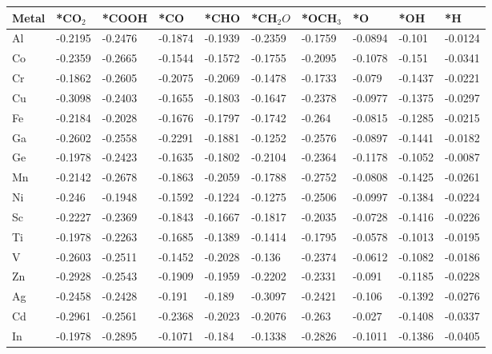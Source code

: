 \begin{table}[h]
  \centering
  {\fontsize{6}{12}\selectfont
  \begin{tabular}{*{10}{l}}
      \hline
      Metal & *CO$_2$ & *COOH& *CO     & *CHO    & *CH$_2O$& *OCH$_3$& *O      & *OH     & *H      \\
      \hline
      Al & -0.2195 & -0.2476 & -0.1874 & -0.1939 & -0.2359 & -0.1759 & -0.0894 & -0.101  & -0.0124 \\
      Co & -0.2359 & -0.2665 & -0.1544 & -0.1572 & -0.1755 & -0.2095 & -0.1078 & -0.151  & -0.0341 \\
      Cr & -0.1862 & -0.2605 & -0.2075 & -0.2069 & -0.1478 & -0.1733 & -0.079  & -0.1437 & -0.0221 \\
      Cu & -0.3098 & -0.2403 & -0.1655 & -0.1803 & -0.1647 & -0.2378 & -0.0977 & -0.1375 & -0.0297 \\
      Fe & -0.2184 & -0.2028 & -0.1676 & -0.1797 & -0.1742 & -0.264  & -0.0815 & -0.1285 & -0.0215 \\
      Ga & -0.2602 & -0.2558 & -0.2291 & -0.1881 & -0.1252 & -0.2576 & -0.0897 & -0.1441 & -0.0182 \\
      Ge & -0.1978 & -0.2423 & -0.1635 & -0.1802 & -0.2104 & -0.2364 & -0.1178 & -0.1052 & -0.0087 \\
      Mn & -0.2142 & -0.2678 & -0.1863 & -0.2059 & -0.1788 & -0.2752 & -0.0808 & -0.1425 & -0.0261 \\
      Ni & -0.246  & -0.1948 & -0.1592 & -0.1224 & -0.1275 & -0.2506 & -0.0997 & -0.1384 & -0.0224 \\
      Sc & -0.2227 & -0.2369 & -0.1843 & -0.1667 & -0.1817 & -0.2035 & -0.0728 & -0.1416 & -0.0226 \\
      Ti & -0.1978 & -0.2263 & -0.1685 & -0.1389 & -0.1414 & -0.1795 & -0.0578 & -0.1013 & -0.0195 \\
      V  & -0.2603 & -0.2511 & -0.1452 & -0.2028 & -0.136  & -0.2374 & -0.0612 & -0.1082 & -0.0186 \\
      Zn & -0.2928 & -0.2543 & -0.1909 & -0.1959 & -0.2202 & -0.2331 & -0.091  & -0.1185 & -0.0228 \\
      Ag & -0.2458 & -0.2428 & -0.191  & -0.189  & -0.3097 & -0.2421 & -0.106  & -0.1392 & -0.0276 \\
      Cd & -0.2961 & -0.2561 & -0.2368 & -0.2023 & -0.2076 & -0.263  & -0.027  & -0.1408 & -0.0337 \\
      In & -0.1978 & -0.2895 & -0.1071 & -0.184  & -0.1338 & -0.2826 & -0.1011 & -0.1386 & -0.0405 \\

\end{tabular}}
\end{table}
